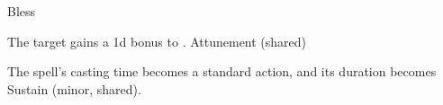 \begin{spellsection}{Bless}
\begin{spellheader}
\end{spellheader}
\begin{spellcontent}
\begin{spelltargetinginfo}
\end{spelltargetinginfo}
\begin{spelleffects}
\spelleffect The target gains a \plus1d bonus to .
\spelldur Attunement (shared)
\end{spelleffects}
\end{spellcontent}
\begin{spellfooter}
\end{spellfooter}
\begin{spellsubcontent}
\begin{spellcantrip}
The spell's casting time becomes a standard action, and its duration becomes Sustain (minor, shared).
\end{spellcantrip}
\end{spellsubcontent}
\end{spellsection}

